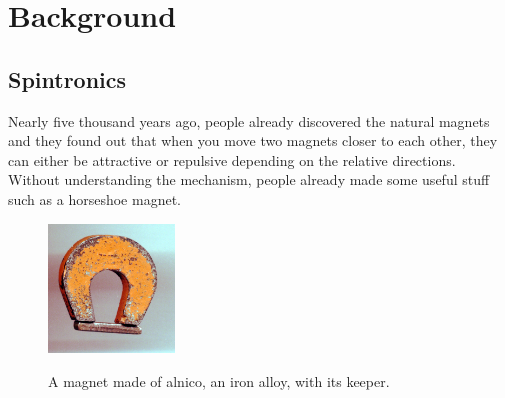 \chapter{Background}

\section{Spintronics}

Nearly five thousand years ago, people already discovered the natural magnets and they found out that when you move two magnets closer to each other, they can either be attractive or repulsive depending on the relative directions. Without understanding the mechanism, people already made some useful stuff such as a horseshoe magnet\cite{wiki:Ferromagnetism}.

\begin{figure}[!ht]
\centering
\includegraphics[width=0.3\textwidth]{fig/Magnet.jpg}
\label{Magnet}
\caption{A magnet made of alnico, an iron alloy, with its keeper.}
\end{figure}

